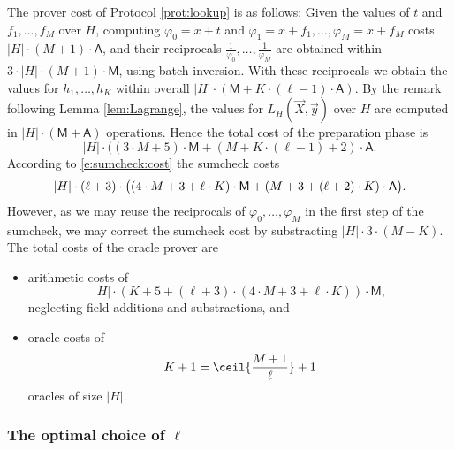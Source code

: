 \documentclass[11pt]{article}
\theoremstyle{definition}
\theoremstyle{definition}
\begin{document}
The prover cost of Protocol \ref{prot:lookup} is as follows:
Given the values of $t$ and $f_1, \ldots, f_M$  over $H$, computing $\varphi_0 = x + t$ and $\varphi_1 = x + f_1, \ldots, \varphi_M = x + f_M$ costs $|H|\cdot (M+ 1) \cdot\mathsf A$, and their reciprocals $\frac{1}{\varphi_0},  \ldots, \frac{1}{\varphi_M}$ are obtained within $3\cdot |H| \cdot (M+1) \cdot\mathsf M$, using batch inversion. 
With these reciprocals we obtain the values for $h_1, \ldots, h_K$ within overall $|H|\cdot (\mathsf M + K\cdot (\ell - 1) \cdot \mathsf A)$. 
By the remark following Lemma \ref{lem:Lagrange}, the values for $L_H(\vec X, \vec y)$ over $H$ are computed in $|H|\cdot (\mathsf M + \mathsf A)$ operations. 
Hence the total cost of the preparation phase is
\begin{equation*}
|H|\cdot ((3\cdot M + 5)\cdot\mathsf M + (M + K\cdot (\ell-1)+ 2) \cdot\mathsf A.
\end{equation*}
According to \eqref{e:sumcheck:cost} the sumcheck costs  
\begin{equation*}
|H| \cdot  (\ell + 3)\cdot \big( (4\cdot M+ 3 + \ell \cdot K)  \cdot\textsf M + 
	(M + 3  + (\ell + 2)\cdot K) \cdot \textsf A\big).
\end{equation*}
However, as we may reuse the reciprocals of $\varphi_0,  \ldots, \varphi_{M}$ in the first step of the sumcheck, we may correct the sumcheck cost by substracting $|H|\cdot 3\cdot (M - K)$. 
The total costs of the oracle prover are 
\begin{itemize}
\item
arithmetic costs of
\begin{equation}
\label{e:lookup:cost}
|H| \cdot \left(K+ 5  + (\ell + 3)\cdot (4\cdot M+ 3 + \ell \cdot K) \right) \cdot \mathsf M,
\end{equation}
neglecting field additions and substractions, and
\item 
oracle costs of 
\begin{equation}
K+1 = \ceil{\frac{M+1}{\ell}} + 1
\end{equation} 
oracles of size $|H|$.
\end{itemize}



\subsubsection{The optimal choice of $\ell$}
\end{document}
